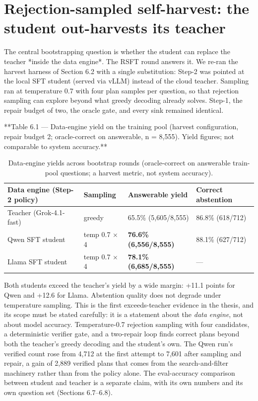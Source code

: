 \documentclass[10pt]{article} %
\begin{document}
\section{Rejection-sampled self-harvest: the student out-harvests its teacher}\label{sec:rejection-sampled-self-harvest-the-stude}

The central bootstrapping question is whether the student can replace the teacher *inside the
data engine*. The RSFT round answers it. We re-ran the harvest harness of Section 6.2 with a
single substitution: Step-2 was pointed at the local SFT student (served via vLLM) instead of
the cloud teacher. Sampling ran at temperature 0.7 with four plan samples per question, so
that rejection sampling can explore beyond what greedy decoding already solves. Step-1, the repair
budget of two, the oracle gate, and every sink remained identical.

**Table 6.1 --- Data-engine yield on the training pool (harvest configuration, repair budget 2;
oracle-correct on answerable, n = 8,555). Yield figures; not comparable to system accuracy.**

\begin{table}[t]
\centering
\small
\caption{Data-engine yields across bootstrap rounds (oracle-correct on answerable train-pool questions; a harvest metric, not system accuracy).}
\label{tab:06_experiments_1}
\begin{tabular}{llll}
\toprule
Data engine (Step-2 policy) & Sampling & Answerable yield & Correct abstention \\
\midrule
Teacher (Grok-4.1-fast) & greedy & 65.5\% (5,605/8,555) & 86.8\% (618/712) \\
Qwen SFT student & temp 0.7 $\times$ 4 & \textbf{76.6\% (6,556/8,555)} & 88.1\% (627/712) \\
Llama SFT student & temp 0.7 $\times$ 4 & \textbf{78.1\% (6,685/8,555)} & --- \\
\bottomrule
\end{tabular}
\end{table}


Both students exceed the teacher's yield by a wide margin: +11.1 points for Qwen and +12.6 for
Llama. Abstention quality does not degrade under temperature sampling. This is the first
exceeds-teacher evidence in the thesis, and its scope must be stated carefully: it is a
statement about the \emph{data engine}, not about model accuracy. Temperature-0.7 rejection
sampling with four candidates, a deterministic verifier gate, and a two-repair loop finds
correct plans beyond both the teacher's greedy decoding and the student's own. The Qwen run's
verified count rose from 4,712 at the first attempt to 7,601 after sampling and repair, a gain
of 2,889 verified plans that comes from the search-and-filter machinery rather than from the
policy alone. The eval-accuracy comparison between student and teacher is a separate claim,
with its own numbers and its own question set (Sections 6.7--6.8).
\end{document}
